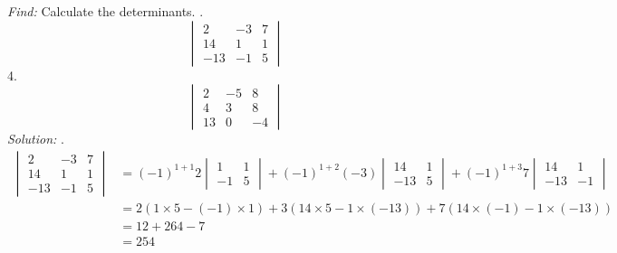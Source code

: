 \documentclass[11pt]{homework}
\begin{document}
\newpage
{}
\emph{Find:}
\newline
Calculate the determinants.
.
\begin{equation*}
  \begin{vmatrix}
  2 & -3 & 7 \\
  14 & 1 & 1 \\
  -13& -1 & 5 
  \end{vmatrix}
\end{equation*}
4.
\begin{equation*}
  \begin{vmatrix}
  2 & -5 & 8 \\
  4 & 3 & 8 \\
  13 & 0 & -4
  \end{vmatrix}
\end{equation*}
\newline
\emph{Solution:}
.
\begin{align*}
  \begin{vmatrix}
    2 & -3 & 7 \\
    14 & 1 & 1 \\
    -13& -1 & 5 
  \end{vmatrix}
  &=
  (-1)^{1+1} 2 
  \begin{vmatrix}
    1 & 1 \\
    -1 & 5 
  \end{vmatrix}
  +
  (-1)^{1+2} (-3)
  \begin{vmatrix}
    14 & 1 \\
    -13 & 5 
  \end{vmatrix}
  +
  (-1)^{1+3} 7
  \begin{vmatrix}
    14 & 1 \\
    -13 & -1 
  \end{vmatrix} \\
  &=
  2 (1 \times 5 - (-1) \times 1)
  +
  3 (14 \times 5 - 1 \times (-13))
  +
  7 (14 \times (-1) - 1 \times (-13)) \\
  &= 12 + 264 - 7 \\
  &= 254
\end{align*}
\end{document}
